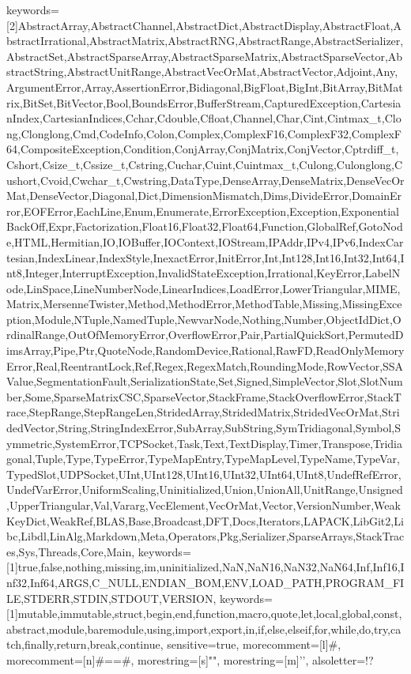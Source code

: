 {    %
    keywords=[2]{AbstractArray,AbstractChannel,AbstractDict,AbstractDisplay,AbstractFloat,AbstractIrrational,AbstractMatrix,AbstractRNG,AbstractRange,AbstractSerializer,AbstractSet,AbstractSparseArray,AbstractSparseMatrix,AbstractSparseVector,AbstractString,AbstractUnitRange,AbstractVecOrMat,AbstractVector,Adjoint,Any,ArgumentError,Array,AssertionError,Bidiagonal,BigFloat,BigInt,BitArray,BitMatrix,BitSet,BitVector,Bool,BoundsError,BufferStream,CapturedException,CartesianIndex,CartesianIndices,Cchar,Cdouble,Cfloat,Channel,Char,Cint,Cintmax_t,Clong,Clonglong,Cmd,CodeInfo,Colon,Complex,ComplexF16,ComplexF32,ComplexF64,CompositeException,Condition,ConjArray,ConjMatrix,ConjVector,Cptrdiff_t,Cshort,Csize_t,Cssize_t,Cstring,Cuchar,Cuint,Cuintmax_t,Culong,Culonglong,Cushort,Cvoid,Cwchar_t,Cwstring,DataType,DenseArray,DenseMatrix,DenseVecOrMat,DenseVector,Diagonal,Dict,DimensionMismatch,Dims,DivideError,DomainError,EOFError,EachLine,Enum,Enumerate,ErrorException,Exception,ExponentialBackOff,Expr,Factorization,Float16,Float32,Float64,Function,GlobalRef,GotoNode,HTML,Hermitian,IO,IOBuffer,IOContext,IOStream,IPAddr,IPv4,IPv6,IndexCartesian,IndexLinear,IndexStyle,InexactError,InitError,Int,Int128,Int16,Int32,Int64,Int8,Integer,InterruptException,InvalidStateException,Irrational,KeyError,LabelNode,LinSpace,LineNumberNode,LinearIndices,LoadError,LowerTriangular,MIME,Matrix,MersenneTwister,Method,MethodError,MethodTable,Missing,MissingException,Module,NTuple,NamedTuple,NewvarNode,Nothing,Number,ObjectIdDict,OrdinalRange,OutOfMemoryError,OverflowError,Pair,PartialQuickSort,PermutedDimsArray,Pipe,Ptr,QuoteNode,RandomDevice,Rational,RawFD,ReadOnlyMemoryError,Real,ReentrantLock,Ref,Regex,RegexMatch,RoundingMode,RowVector,SSAValue,SegmentationFault,SerializationState,Set,Signed,SimpleVector,Slot,SlotNumber,Some,SparseMatrixCSC,SparseVector,StackFrame,StackOverflowError,StackTrace,StepRange,StepRangeLen,StridedArray,StridedMatrix,StridedVecOrMat,StridedVector,String,StringIndexError,SubArray,SubString,SymTridiagonal,Symbol,Symmetric,SystemError,TCPSocket,Task,Text,TextDisplay,Timer,Transpose,Tridiagonal,Tuple,Type,TypeError,TypeMapEntry,TypeMapLevel,TypeName,TypeVar,TypedSlot,UDPSocket,UInt,UInt128,UInt16,UInt32,UInt64,UInt8,UndefRefError,UndefVarError,UniformScaling,Uninitialized,Union,UnionAll,UnitRange,Unsigned,UpperTriangular,Val,Vararg,VecElement,VecOrMat,Vector,VersionNumber,WeakKeyDict,WeakRef,BLAS,Base,Broadcast,DFT,Docs,Iterators,LAPACK,LibGit2,Libc,Libdl,LinAlg,Markdown,Meta,Operators,Pkg,Serializer,SparseArrays,StackTraces,Sys,Threads,Core,Main},%
    keywords=[1]{true,false,nothing,missing,im,uninitialized,NaN,NaN16,NaN32,NaN64,Inf,Inf16,Inf32,Inf64,ARGS,C_NULL,ENDIAN_BOM,ENV,LOAD_PATH,PROGRAM_FILE,STDERR,STDIN,STDOUT,VERSION},
    keywords=[1]{mutable,immutable,struct,begin,end,function,macro,quote,let,local,global,const,abstract,module,baremodule,using,import,export,in,if,else,elseif,for,while,do,try,catch,finally,return,break,continue},%
    sensitive=true,
    morecomment=[l]{\#},
    morecomment=[n]{\#=}{=\#},
    morestring=[s]{"}{"},
    morestring=[m]{'}{'},
    alsoletter=!?
}


